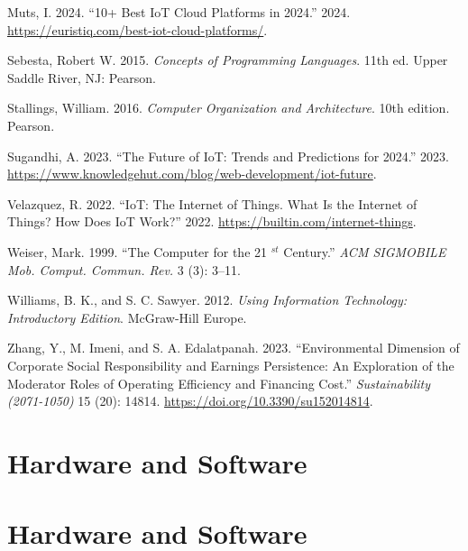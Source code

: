 \documentclass[
  letterpaper,
  DIV=11,
  numbers=noendperiod]{scrreprt}
\newlength{\cslhangindent}
\newenvironment{CSLReferences}[2] %
 {\begin{list}{}{%
  \setlength{\itemindent}{0pt}
  \setlength{\leftmargin}{0pt}
  \setlength{\parsep}{0pt}
  \ifodd #1
   \setlength{\leftmargin}{\cslhangindent}
   \setlength{\itemindent}{-1\cslhangindent}
  \fi
  \setlength{\itemsep}{#2\baselineskip}}}
 {\end{list}}
\begin{document}
\begin{CSLReferences}{1}{0}
Muts, I. 2024. {``10+ Best IoT Cloud Platforms in 2024.''} 2024.
\url{https://euristiq.com/best-iot-cloud-platforms/}.

Sebesta, Robert W. 2015. \emph{Concepts of Programming Languages}. 11th
ed. Upper Saddle River, NJ: Pearson.

Stallings, William. 2016. \emph{Computer Organization and Architecture}.
10th edition. Pearson.

Sugandhi, A. 2023. {``The Future of IoT: Trends and Predictions for
2024.''} 2023.
\url{https://www.knowledgehut.com/blog/web-development/iot-future}.

Velazquez, R. 2022. {``IoT: The Internet of Things. What Is the Internet
of Things? How Does IoT Work?''} 2022.
\url{https://builtin.com/internet-things}.

Weiser, Mark. 1999. {``The Computer for the 21 \(^{st}\) Century.''}
\emph{ACM SIGMOBILE Mob. Comput. Commun. Rev.} 3 (3): 3--11.

Williams, B. K., and S. C. Sawyer. 2012. \emph{Using Information
Technology: Introductory Edition}. McGraw-Hill Europe.

Zhang, Y., M. Imeni, and S. A. Edalatpanah. 2023. {``Environmental
Dimension of Corporate Social Responsibility and Earnings Persistence:
An Exploration of the Moderator Roles of Operating Efficiency and
Financing Cost.''} \emph{Sustainability (2071-1050)} 15 (20): 14814.
\url{https://doi.org/10.3390/su152014814}.

\end{CSLReferences}


\chapter{Hardware and Software}\label{hardware-and-software}


\chapter{Hardware and Software}\label{hardware-and-software-1}
\end{document}
